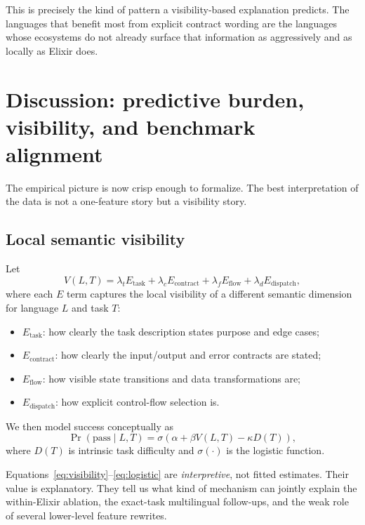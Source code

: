 \documentclass[11pt]{article}
\newcommand{\elixir}{Elixir}
\begin{document}
This is precisely the kind of pattern a visibility-based explanation predicts. The languages that benefit most from explicit contract wording are the languages whose ecosystems do not already surface that information as aggressively and as locally as \elixir{} does.

\section{Discussion: predictive burden, visibility, and benchmark alignment}

The empirical picture is now crisp enough to formalize. The best interpretation of the data is not a one-feature story but a visibility story.

\subsection{Local semantic visibility}

Let
\begin{equation}
V(L,T) = \lambda_t E_{\mathrm{task}} + \lambda_c E_{\mathrm{contract}} + \lambda_f E_{\mathrm{flow}} + \lambda_d E_{\mathrm{dispatch}},
\label{eq:visibility}
\end{equation}
where each $E$ term captures the local visibility of a different semantic dimension for language $L$ and task $T$:
\begin{itemize}
  \item $E_{\mathrm{task}}$: how clearly the task description states purpose and edge cases;
  \item $E_{\mathrm{contract}}$: how clearly the input/output and error contracts are stated;
  \item $E_{\mathrm{flow}}$: how visible state transitions and data transformations are;
  \item $E_{\mathrm{dispatch}}$: how explicit control-flow selection is.
\end{itemize}

We then model success conceptually as
\begin{equation}
\Pr(\mathrm{pass} \mid L,T) = \sigma\!\left(\alpha + \beta V(L,T) - \kappa D(T)\right),
\label{eq:logistic}
\end{equation}
where $D(T)$ is intrinsic task difficulty and $\sigma(\cdot)$ is the logistic function.

Equations~\eqref{eq:visibility}--\eqref{eq:logistic} are \emph{interpretive}, not fitted estimates. Their value is explanatory. They tell us what kind of mechanism can jointly explain the within-\elixir{} ablation, the exact-task multilingual follow-ups, and the weak role of several lower-level feature rewrites.
\end{document}
